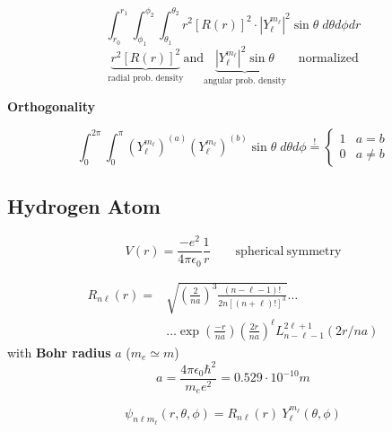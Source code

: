 \newpar{}

\noindent\begin{equation*}
    \int_{r_0}^{r_1} \int_{\phi_1}^{\phi_2} \int_{\theta_1}^{\theta_2} r^2 {\left[R(r)\right]}^2 \cdot |Y_\ell^{m_\ell}|^2 \sin\theta\;d\theta d\phi dr
\end{equation*}
\begin{equation*}
    \underbrace{r^2 {\left[R(r)\right]}^2}_{\text{radial prob.\ density}} \text{and} \underbrace{|Y_\ell^{m_\ell}|^2 \sin\theta}_{\text{angular prob.\ density}} \quad \text{normalized}
\end{equation*}

\textbf{Orthogonality}

\noindent\begin{equation*}
    \int_0^{2\pi}\int_0^{\pi} {(Y_\ell^{m_\ell})}^{(a)}{(Y_\ell^{m_\ell})}^{(b)} \sin\theta\;d\theta d\phi \overset{!}{=} \begin{cases}
        1 & a=b     \\
        0 & a\neq b
    \end{cases}
\end{equation*}

\subsection{Hydrogen Atom}
\noindent\begin{equation*}
    V(r) = \frac{-e^2}{4\pi\epsilon_0}\frac{1}{r}\qquad \mathrm{spherical\ symmetry}
\end{equation*}

\begin{align*}
    R_{n\ell}(r) = & \sqrt{{\left(\frac{2}{na}\right)}^3\frac{(n-\ell-1)!}{2n{[(n+\ell)!]}^3}} \ldots                    \\
                   & \ldots\exp\left(\frac{-r}{na}\right){\left(\frac{2r}{na}\right)}^\ell L_{n-\ell-1}^{2\ell+1}(2r/na)
\end{align*}
with \textbf{Bohr radius} $a$ ($m_e\simeq m$)
\begin{equation*}
    a = \frac{4\pi\epsilon_0\hbar^2}{m_e e^2}=0.529 \cdot 10^{-10}m
\end{equation*}

\begin{equation*}
    \psi_{n\ell m_\ell}(r,\theta,\phi) = R_{n\ell}(r)\:Y_\ell^{m_\ell}(\theta, \phi)
\end{equation*}


